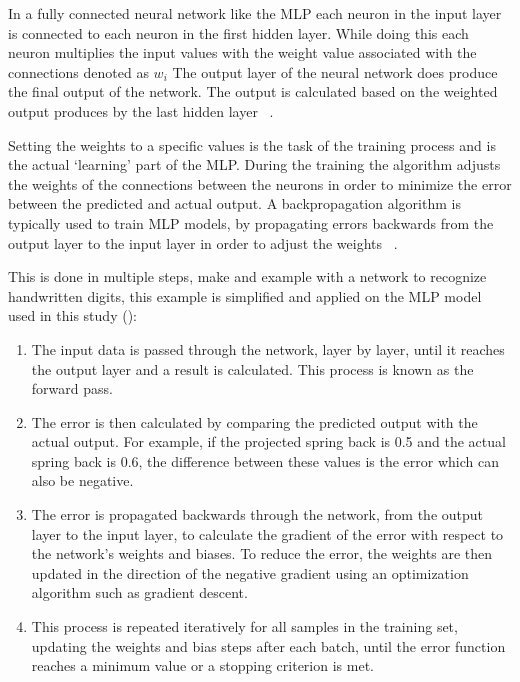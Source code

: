 {In a fully connected neural network like the MLP each neuron in the input layer is connected to each neuron in the
first hidden layer.
While doing this each neuron multiplies the input values with the weight value associated with the connections
denoted as $w_i$
The output layer of the neural network does produce the final output of the network.
The output is calculated based on the weighted output produces by the last hidden layer
~\cite[p. 106]{muller_introductionmachinelearning_2016}.

Setting the weights to a specific values is the task of the training process and is the actual `learning' part of the
MLP.
During the training the algorithm adjusts the weights of the connections between the neurons in order to minimize
the error between the predicted and actual output.
A backpropagation algorithm is typically used to train \ac{MLP} models, by
propagating errors backwards from the output layer to the input layer in order to adjust
the weights
~\cite[p. 454]{taud2018multilayer}.

This is done in multiple steps, \cite{nielsen_neuralnetworksdeep_2015} make and example with a network to recognize
handwritten digits, this example is simplified and applied on the MLP model used in this study
(\cite[p. 12--24]{nielsen_neuralnetworksdeep_2015}):

\begin{enumerate}
    \item The input data is passed through the network, layer by layer, until it reaches the output layer and a
    result is calculated.
    This process is known as the forward pass.
    \item The error is then calculated by comparing the predicted output with the actual output.
    For example, if the projected spring back is 0.5 and the actual spring back is 0.6, the difference between these
    values is the error which can also be negative.
    \item The error is propagated backwards through the network, from the output layer to the input layer, to
    calculate the gradient of the error with respect to the network's weights and biases. To reduce the error,
    the weights are then updated in the direction of the negative gradient using an optimization algorithm such
    as gradient descent.
    \item This process is repeated iteratively for all
    samples in the training set, updating the weights and bias steps after each batch, until the error function
    reaches a minimum value or a stopping criterion is met.
\end{enumerate}

}
